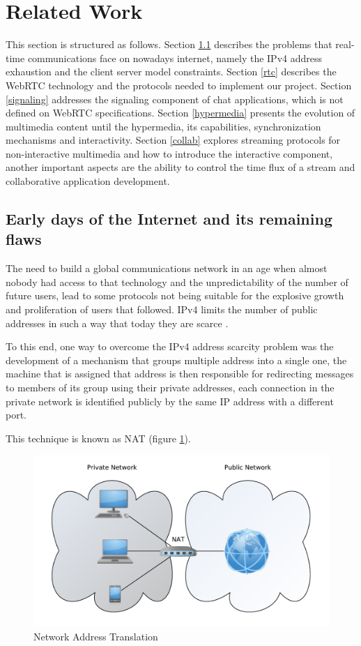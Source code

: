 \documentclass[conference,compsoc,a4paper]{IEEEtran}
\begin{document}
\section{Related Work}
 This section is structured as follows.
 Section \ref{early} describes the problems that real-time communications face on nowadays internet, namely the \gls{IPv4} address exhaustion and the client server model constraints. 
 Section \ref{rtc} describes the \gls{WebRTC} technology and the protocols needed to implement our project. 
 Section \ref{signaling} addresses the signaling component of chat applications, which is not defined on \gls{WebRTC} specifications. 
 Section \ref{hypermedia} presents the evolution of multimedia content until the hypermedia, its capabilities, synchronization mechanisms and interactivity. 
 Section \ref{collab} explores streaming protocols for non-interactive multimedia and how to introduce the interactive component, another important aspects are the ability to control the time flux of a stream and collaborative application development.
        

\subsection{Early days of the Internet and its remaining flaws}\label{early}

The need to build a global communications network in an age when almost nobody had access to that technology and the unpredictability of the number of future users, lead to some protocols not being suitable for the explosive growth and proliferation of users that followed. \gls{IPv4} limits the number of public addresses in such a way that today they are scarce \cite{ipv4}. 

To this end, one way to overcome the \gls{IPv4} address scarcity problem was the development of a mechanism that groups multiple address into a single one, the machine that is assigned that address is then responsible for redirecting messages to members of its group using their private addresses, each connection in the private network is identified publicly by the same \gls{IP} address with a different port.

This technique is known as \gls{NAT} (figure \ref{fig:nat}).

\begin{figure}
	\centering
	\includegraphics[width=\linewidth]{figures/nat.pdf}
	\caption{Network Address Translation}
	\label{fig:nat}
\end{figure}
\end{document}
